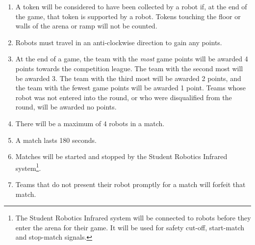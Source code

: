 \begin{enumerate}
\item A token will be considered to have been collected by a robot if, at the end of the game, that token is supported by a robot.
 Tokens touching the floor or walls of the arena or ramp will not be counted.

\item Robots must travel in an anti-clockwise direction to gain any points.

\item At the end of a game, the team with the \emph{most} game points will be awarded 4 points towards the competition league.
 The team with the second most will be awarded 3.
 The team with the third most will be awarded 2 points, and the team with the fewest game points will be awarded 1 point.
 Teams whose robot was not entered into the round, or who were disqualified from the round, will be awarded no points.

\item There will be a maximum of 4 robots in a match.
\item A match lasts 180 seconds.
\item Matches will be started and stopped by the Student Robotics Infrared system\footnote{The Student Robotics Infrared system will be connected to robots before they enter the arena for their game.  It will be used for safety cut-off, start-match and stop-match signals.}.
\item Teams that do not present their robot promptly for a match will forfeit that match.
\end{enumerate}
